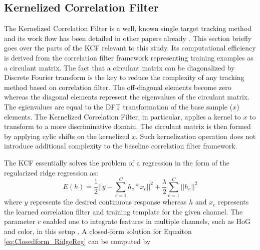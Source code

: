 \documentclass{bmvc2k}
\begin{document}
\subsection{Kernelized Correlation Filter} \label{sec:kcf}
The Kernelized Correlation Filter is a well, known single target
tracking method and its work flow has been detailed in other papers
already \cite{henriques2012exploiting,henriques2015high}. This section
briefly goes over the parts of the KCF relevant to this study. Its
computational efficiency is derived from the correlation filter
framework representing training examples as a circulant matrix. The
fact that a circulant matrix can be diagonalized by Discrete Fourier
transform is the key to reduce the complexity of any tracking method
based on correlation filter. The off-diagonal elements become zero
whereas the diagonal elements represent the eigenvalues of the
circulant matrix. The egienvalues are equal to the DFT transformation
of the base sample ($x$) elements. The Kernelized Correlation Filter,
in particular, applies a kernel to $x$ to transform to a more
discriminative domain. The circulant matrix is then formed by applying
cylic shifts on the kernelized $x$. Such kernelization operation does
not introduce additional complexity to the baseline correlation filter
framework.

The KCF essentially solves the problem of a regression in the form of
the regularized ridge regression as:
\begin{equation}
E(h) = \frac{1}{2}||y-\sum_{c=1}^{C}h_{c}*x_{c}||^{2} + \frac{\lambda}{2}\sum_{c=1}^{C}||h_{c}||^{2}
\label{eq:Closedform_RidgeReg}
\end{equation}
where $y$ represents the desired continuous response whereas $h$ and
$x_{c}$ represents the learned correlation filter and training
template for the given channel. The parameter $c$ enabled one to
integrate features in multiple channels, such as HoG and color, in
this setup \cite{henriques2015high,galoogahi2013multi}. A closed-form
solution for Equaiton \ref{eq:Closedform_RidgeReg} can be computed by
\end{document}

